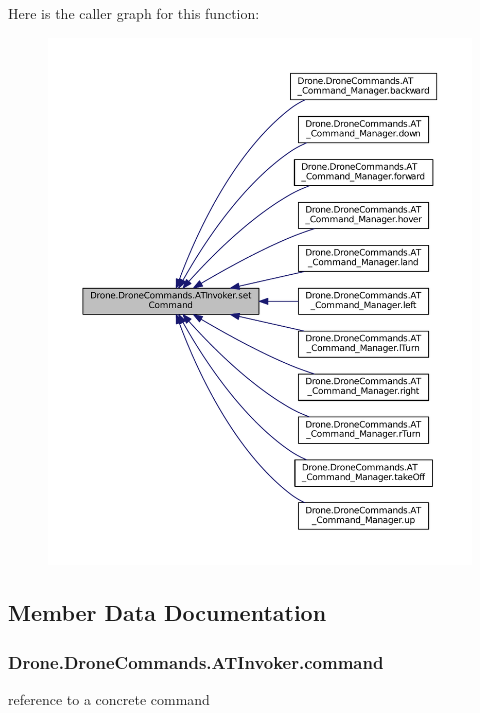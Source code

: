 Here is the caller graph for this function\+:\nopagebreak
\begin{figure}[H]
\begin{center}
\leavevmode
\includegraphics[width=350pt]{class_drone_1_1_drone_commands_1_1_a_t_invoker_af32f17db8eb3a66a6f3d05ec7e00ef0b_icgraph}
\end{center}
\end{figure}




\subsection{Member Data Documentation}
\hypertarget{class_drone_1_1_drone_commands_1_1_a_t_invoker_a8d5969ed00c3e025b91905bf34bb60ed}{}
\subsubsection[{command}]{ Drone.\+Drone\+Commands.\+A\+T\+Invoker.\+command\hspace{0.3cm}{\ttfamily [private]}}\label{class_drone_1_1_drone_commands_1_1_a_t_invoker_a8d5969ed00c3e025b91905bf34bb60ed}
reference to a concrete command 

